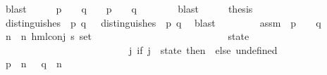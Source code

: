 \begin{isabellebody}
\ blast\isanewline
\ \ \isamarkupfalse%
\ \isamarkupfalse%
\ {\isachardoublequoteopen}{\isacharparenleft}{\kern0pt}{\isacharparenleft}{\kern0pt}p\ {\isasymTurnstile}\ {\isasymphi}{\isacharparenright}{\kern0pt}\ {\isasymand}\ {\isasymnot}{\isacharparenleft}{\kern0pt}q\ {\isasymTurnstile}\ {\isasymphi}{\isacharparenright}{\kern0pt}{\isacharparenright}{\kern0pt}\ {\isasymor}\ {\isacharparenleft}{\kern0pt}{\isasymnot}{\isacharparenleft}{\kern0pt}p\ {\isasymTurnstile}\ {\isasymphi}{\isacharparenright}{\kern0pt}\ {\isasymand}\ {\isacharparenleft}{\kern0pt}q\ {\isasymTurnstile}\ {\isasymphi}{\isacharparenright}{\kern0pt}{\isacharparenright}{\kern0pt}{\isachardoublequoteclose}\isanewline
\ \ \ \ \isamarkupfalse%
\ blast\isanewline
\ \ \isamarkupfalse%
\ \isamarkupfalse%
\ {\isacharquery}{\kern0pt}thesis\isanewline
\ \ \isamarkupfalse%
\isanewline
\ \ \ \ \isamarkupfalse%
\ {\isachardoublequoteopen}distinguishes\ {\isasymphi}\ p\ q\ {\isasymLongrightarrow}\ {\isasymexists}{\isasymphi}{\isachardot}{\kern0pt}\ distinguishes\ {\isasymphi}\ p\ q{\isachardoublequoteclose}\ \isamarkupfalse%
\ blast\isanewline
\ \ \isamarkupfalse%
\isanewline
\ \ \ \ \isamarkupfalse%
\ assm{\isacharcolon}{\kern0pt}\ {\isachardoublequoteopen}{\isasymnot}\ p\ {\isasymTurnstile}\ {\isasymphi}\ {\isasymand}\ q\ {\isasymTurnstile}\ {\isasymphi}{\isachardoublequoteclose}\isanewline
\ \ \ \ \isamarkupfalse%
\ n{\isasymphi}\ \ {\isachardoublequoteopen}n{\isasymphi}\ {\isasymequiv}{\isacharparenleft}{\kern0pt}hml{\isacharunderscore}{\kern0pt}conj\ {\isacharparenleft}{\kern0pt}{\isacharbraceleft}{\kern0pt}{\isacharbraceright}{\kern0pt}{\isacharcolon}{\kern0pt}{\isacharcolon}{\kern0pt}{\isacharprime}{\kern0pt}s\ set{\isacharparenright}{\kern0pt}\ \isanewline
\ \ \ \ \ \ \ \ \ \ \ \ \ \ \ \ \ \ \ \ \ \ \ \ \ \ {\isacharbraceleft}{\kern0pt}state{\isacharbraceright}{\kern0pt}\ \isanewline
\ \ \ \ \ \ \ \ \ \ \ \ \ \ \ \ \ \ \ \ \ \ \ \ \ \ {\isacharparenleft}{\kern0pt}{\isasymlambda}j{\isachardot}{\kern0pt}\ if\ j\ {\isacharequal}{\kern0pt}\ state\ then\ {\isasymphi}\ else\ undefined{\isacharparenright}{\kern0pt}{\isacharparenright}{\kern0pt}{\isachardoublequoteclose}\isanewline
\ \ \ \ \isamarkupfalse%
\ {\isachardoublequoteopen}p\ {\isasymTurnstile}\ n{\isasymphi}\ {\isasymand}\ {\isasymnot}\ q\ {\isasymTurnstile}\ n{\isasymphi}{\isachardoublequoteclose}\ \isanewline
\ \ \ \ \ \ \isamarkupfalse%

\end{isabellebody}

